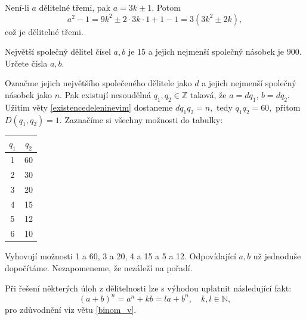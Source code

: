 \begin{reseni}
Není-li $a$ dělitelné třemi, pak $a=3k\pm 1.$ Potom
$$a^2-1=9k^2\pm 2\cdot 3k\cdot 1+1-1=3(3k^2\pm 2k),$$
což je dělitelné třemi.
\end{reseni}

\begin{priklad}
Největší společný dělitel čísel $a,b$ je 15 a jejich nejmenší společný násobek je 900.
Určete čísla $a,b$.
\end{priklad}

\begin{reseni}
Označme jejich největšího společeného dělitele jako $d$ a jejich nejmenší společný násobek
jako $n$. Pak existují nesoudělná $q_1, q_2 \in \mathbb Z$ taková, že $a=dq_1$, $b=dq_2$.
Užitím věty \ref{existencedeleninevim} dostaneme $dq_1q_2=n,$ tedy $q_1q_2=60,$ přitom
$D(q_1,q_2)=1.$ Zaznačíme si všechny možnosti do tabulky:
\begin{center}
	\begin{tabular}{c | c}
		$q_1$ & $q_2$ \\
		\hline
		1 & 60 \\
		2 & 30 \\
		3 & 20 \\
		4 & 15 \\
		5 & 12 \\
		6 & 10
	\end{tabular}
\end{center}
Vyhovují možnosti 1 a 60, 3 a 20, 4 a 15 a 5 a 12. Odpovídající $a, b$ už jednoduše dopočítáme. Nezapomeneme,
že nezáleží na pořadí.
\end{reseni}

\begin{pozn}
  Při řešení některých úloh z dělitelnosti lze s výhodou uplatnit následující fakt:
  \[
    (a+b)^n=a^n+kb=la+b^n,\quad k,l\in \mathbb N,
  \]
  pro zdůvodnění viz větu \ref{binom_v}.
\end{pozn}

